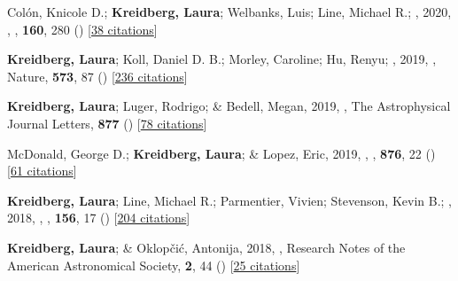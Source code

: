 \item[{\color{numcolor}\scriptsize17}] Col{\'o}n, Knicole D.; \textbf{Kreidberg, Laura}; Welbanks, Luis; Line, Michael R.; \etal, 2020, , \aj, \textbf{160}, 280 () [\href{https://ui.adsabs.harvard.edu/abs/2020AJ....160..280C}{38 citations}]

\item[{\color{numcolor}\scriptsize16}] \textbf{Kreidberg, Laura}; Koll, Daniel D. B.; Morley, Caroline; Hu, Renyu; \etal, 2019, , Nature, \textbf{573}, 87 () [\href{https://ui.adsabs.harvard.edu/abs/2019Natur.573...87K}{236 citations}]

\item[{\color{numcolor}\scriptsize15}] \textbf{Kreidberg, Laura}; Luger, Rodrigo; \& Bedell, Megan, 2019, , The Astrophysical Journal Letters, \textbf{877} () [\href{https://ui.adsabs.harvard.edu/abs/2019ApJ...877L..15K}{78 citations}]

\item[{\color{numcolor}\scriptsize14}] McDonald, George D.; \textbf{Kreidberg, Laura}; \& Lopez, Eric, 2019, , \apj, \textbf{876}, 22 () [\href{https://ui.adsabs.harvard.edu/abs/2019ApJ...876...22M}{61 citations}]

\item[{\color{numcolor}\scriptsize13}] \textbf{Kreidberg, Laura}; Line, Michael R.; Parmentier, Vivien; Stevenson, Kevin B.; \etal, 2018, , \aj, \textbf{156}, 17 () [\href{https://ui.adsabs.harvard.edu/abs/2018AJ....156...17K}{204 citations}]

\item[{\color{numcolor}\scriptsize12}] \textbf{Kreidberg, Laura}; \& Oklop{\v{c}}i{\'c}, Antonija, 2018, , Research Notes of the American Astronomical Society, \textbf{2}, 44 () [\href{https://ui.adsabs.harvard.edu/abs/2018RNAAS...2...44K}{25 citations}]

